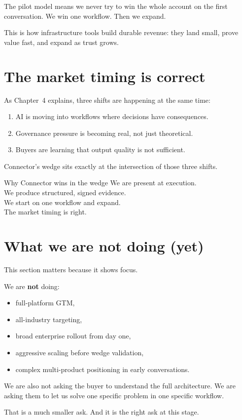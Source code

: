 The pilot model means we never try to win the whole account on the first conversation.
We win one workflow.
Then we expand.

This is how infrastructure tools build durable revenue:
they land small, prove value fast, and expand as trust grows.

\section{The market timing is correct}

As Chapter~4 explains, three shifts are happening at the same time:

\begin{enumerate}
  \item AI is moving into workflows where decisions have consequences.
  \item Governance pressure is becoming real, not just theoretical.
  \item Buyers are learning that output quality is not sufficient.
\end{enumerate}

Connector's wedge sits exactly at the intersection of those three shifts.

\begin{conceptbox}{Why Connector wins in the wedge}
We are present at execution.\\
We produce structured, signed evidence.\\
We start on one workflow and expand.\\
The market timing is right.
\end{conceptbox}

\section{What we are not doing (yet)}

This section matters because it shows focus.

We are \textbf{not} doing:

\begin{itemize}
  \item full-platform GTM,
  \item all-industry targeting,
  \item broad enterprise rollout from day one,
  \item aggressive scaling before wedge validation,
  \item complex multi-product positioning in early conversations.
\end{itemize}

We are also not asking the buyer to understand the full architecture.
We are asking them to let us solve one specific problem in one specific workflow.

That is a much smaller ask.
And it is the right ask at this stage.
